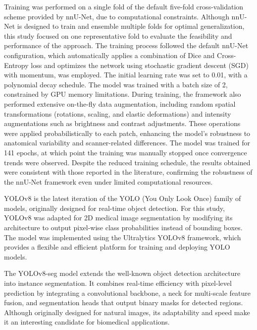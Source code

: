 \documentclass[12pt]{article}
\begin{document}
Training was performed on a single fold of the default five-fold cross-validation scheme provided by nnU-Net, due to computational constraints. Although nnU-Net is designed to train and ensemble multiple folds for optimal generalization, this study focused on one representative fold to evaluate the feasibility and performance of the approach.
%
The training process followed the default nnU-Net configuration, which automatically applies a combination of Dice and Cross-Entropy loss and optimizes the network using stochastic gradient descent (SGD) with momentum, was employed. The initial learning rate was set to 0.01, with a polynomial decay schedule. The model was trained with a batch size of 2, constrained by GPU memory limitations.
%
During training, the framework also performed extensive on-the-fly data augmentation, including random spatial transformations (rotations, scaling, and elastic deformations) and intensity augmentations such as brightness and contrast adjustments. These operations were applied probabilistically to each patch, enhancing the model’s robustness to anatomical variability and scanner-related differences.
%
The model was trained for 141 epochs, at which point the training was manually stopped once convergence trends were observed. Despite the reduced training schedule, the results obtained were consistent with those reported in the literature, confirming the robustness of the nnU-Net framework even under limited computational resources.


YOLOv8 is the latest iteration of the YOLO (You Only Look Once) family of models, originally designed for real-time object detection. For this study, YOLOv8 was adapted for 2D medical image segmentation by modifying its architecture to output pixel-wise class probabilities instead of bounding boxes. The model was implemented using the Ultralytics YOLOv8 framework, which provides a flexible and efficient platform for training and deploying YOLO models.

The YOLOv8-seg model extends the well-known object detection architecture into instance segmentation. It combines real-time efficiency with pixel-level prediction by integrating a convolutional backbone, a neck for multi-scale feature fusion, and segmentation heads that output binary masks for detected regions. Although originally designed for natural images, its adaptability and speed make it an interesting candidate for biomedical applications. 
\end{document}
